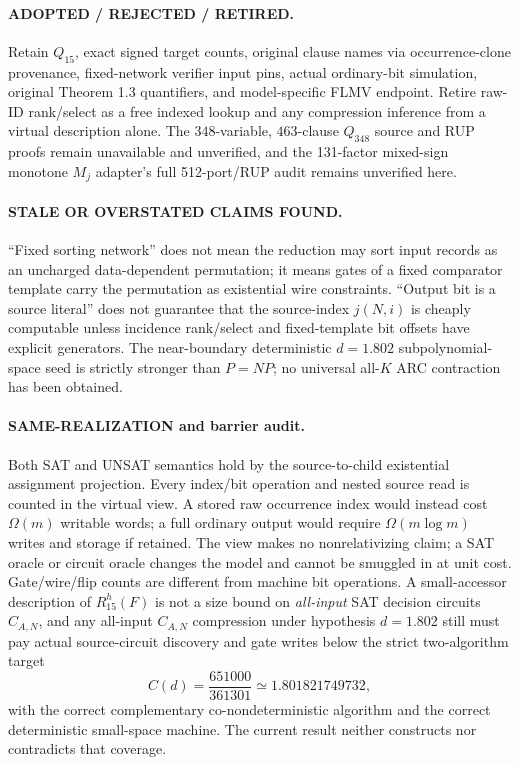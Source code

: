 \documentclass[11pt]{article}
\begin{document}
\paragraph{ADOPTED / REJECTED / RETIRED.} Retain $Q_{15}$, exact signed target counts, original clause names via occurrence-clone provenance, fixed-network verifier input pins, actual ordinary-bit simulation, original Theorem 1.3 quantifiers, and model-specific FLMV endpoint. Retire raw-ID rank/select as a free indexed lookup and any compression inference from a virtual description alone. The $348$-variable, $463$-clause $Q_{348}$ source and RUP proofs remain unavailable and unverified, and the 131-factor mixed-sign monotone $M_j$ adapter's full 512-port/RUP audit remains unverified here.
\paragraph{STALE OR OVERSTATED CLAIMS FOUND.} ``Fixed sorting network'' does not mean the reduction may sort input records as an uncharged data-dependent permutation; it means gates of a fixed comparator template carry the permutation as existential wire constraints. ``Output bit is a source literal'' does not guarantee that the source-index $j(N,i)$ is cheaply computable unless incidence rank/select and fixed-template bit offsets have explicit generators. The near-boundary deterministic $d=1.802$ subpolynomial-space seed is strictly stronger than $P=NP$; no universal all-$K$ ARC contraction has been obtained.

\paragraph{SAME-REALIZATION and barrier audit.} Both SAT and UNSAT semantics hold by the source-to-child existential assignment projection. Every index/bit operation and nested source read is counted in the virtual view. A stored raw occurrence index would instead cost $\Omega(m)$ writable words; a full ordinary output would require $\Omega(m\log m)$ writes and storage if retained. The view makes no nonrelativizing claim; a SAT oracle or circuit oracle changes the model and cannot be smuggled in at unit cost. Gate/wire/flip counts are different from machine bit operations. A small-accessor description of $R_{15}^{h}(F)$ is not a size bound on \emph{all-input} SAT decision circuits $C_{A,N}$, and any all-input $C_{A,N}$ compression under hypothesis $d=1.802$ still must pay actual source-circuit discovery and gate writes below the strict two-algorithm target
\[
 C(d)=\frac{651000}{361301}\simeq1.801821749732,
\]
with the correct complementary co-nondeterministic algorithm and the correct deterministic small-space machine. The current result neither constructs nor contradicts that coverage.
\end{document}
